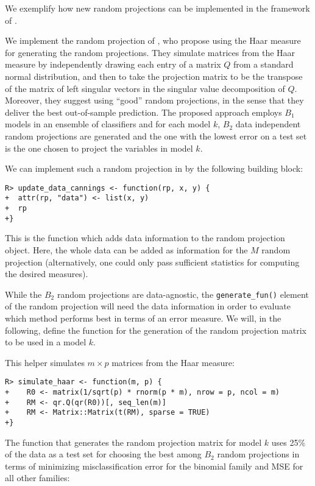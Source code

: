\documentclass[
  article]{jss}
\begin{document}
We exemplify how new random projections can be implemented in the
framework of .

We implement the random projection of \citet{cannings2017random}, who
propose using the Haar measure for generating the random projections.
They simulate matrices from the Haar measure by independently drawing
each entry of a matrix \(Q\) from a standard normal distribution, and
then to take the projection matrix to be the transpose of the matrix of
left singular vectors in the singular value decomposition of \(Q\).
Moreover, they suggest using ``good'' random projections, in the sense
that they deliver the best out-of-sample prediction. The proposed
approach employs \(B_1\) models in an ensemble of classifiers and for
each model \(k\), \(B_2\) data independent random projections are
generated and the one with the lowest error on a test set is the one
chosen to project the variables in model \(k\).

We can implement such a random projection in  by the following
building block:

\begin{verbatim}
R> update_data_cannings <- function(rp, x, y) {
+  attr(rp, "data") <- list(x, y)
+  rp
+}
\end{verbatim}

This is the function which adds data information to the random
projection object. Here, the whole data can be added as information for
the \(M\) random projection (alternatively, one could only pass
sufficient statistics for computing the desired measures).

While the \(B_2\) random projections are data-agnostic, the
\texttt{generate\_fun()} element of the random projection will need the
data information in order to evaluate which method performs best in
terms of an error measure. We will, in the following, define the
function for the generation of the random projection matrix to be used
in a model \(k\).

This helper simulates \(m\times p\) matrices from the Haar measure:

\begin{verbatim}
R> simulate_haar <- function(m, p) {
+    R0 <- matrix(1/sqrt(p) * rnorm(p * m), nrow = p, ncol = m)
+    RM <- qr.Q(qr(R0))[, seq_len(m)]
+    RM <- Matrix::Matrix(t(RM), sparse = TRUE)  
+}
\end{verbatim}

The function that generates the random projection matrix for model \(k\)
uses 25\% of the data as a test set for choosing the best among \(B_2\)
random projections in terms of minimizing misclassification error for
the binomial family and MSE for all other families:
\end{document}
